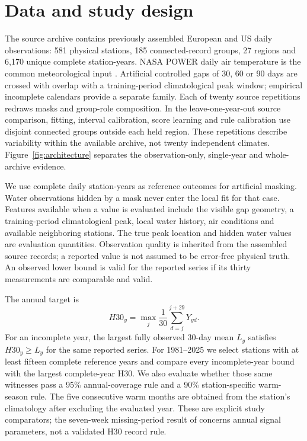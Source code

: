 \documentclass[draft,linenumbers]{agujournal2025}
\begin{document}
\section{Data and study design}
The source archive contains previously assembled European and US daily observations: 581 physical stations, 185 connected-record groups, 27 regions and 6,170 unique complete station-years. NASA POWER daily air temperature is the common meteorological input \cite{nasapower2026}. Artificial controlled gaps of 30, 60 or 90 days are crossed with overlap with a training-period climatological peak window; empirical incomplete calendars provide a separate family. Each of twenty source repetitions redraws masks and group-role composition. In the leave-one-year-out source comparison, fitting, interval calibration, score learning and rule calibration use disjoint connected groups outside each held region. These repetitions describe variability within the available archive, not twenty independent climates. Figure~\ref{fig:architecture} separates the observation-only, single-year and whole-archive evidence.

We use complete daily station-years as reference outcomes for artificial masking. Water observations hidden by a mask never enter the local fit for that case. Features available when a value is evaluated include the visible gap geometry, a training-period climatological peak, local water history, air conditions and available neighboring stations. The true peak location and hidden water values are evaluation quantities. Observation quality is inherited from the assembled source records; a reported value is not assumed to be error-free physical truth. An observed lower bound is valid for the reported series if its thirty measurements are comparable and valid.

The annual target is
\begin{equation}
 H30_y=\max_{j}\frac{1}{30}\sum_{d=j}^{j+29}Y_{yd}.
\end{equation}
For an incomplete year, the largest fully observed 30-day mean $L_y$ satisfies $H30_y\ge L_y$ for the same reported series. For 1981--2025 we select stations with at least fifteen complete reference years and compare every incomplete-year bound with the largest complete-year H30. We also evaluate whether those same witnesses pass a 95\% annual-coverage rule and a 90\% station-specific warm-season rule. The five consecutive warm months are obtained from the station's climatology after excluding the evaluated year. These are explicit study comparators; the seven-week missing-period result of  concerns annual signal parameters, not a validated H30 record rule.

\end{document}
